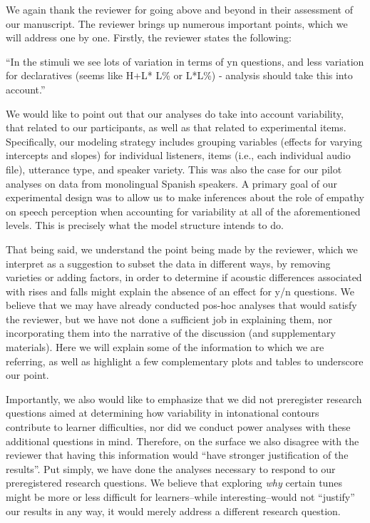 \documentclass[]{article}
\begin{document}
We again thank the reviewer for going above and beyond in their assessment of our manuscript.
The reviewer brings up numerous important points, which we will address one by one.
Firstly, the reviewer states the following:

``In the stimuli we see lots of variation in terms of yn questions, and less variation for declaratives (seems like H+L* L\% or L*L\%) - analysis should take this into account.''

We would like to point out that our analyses do take into account variability, that related to our participants, as well as that related to experimental items.
Specifically, our modeling strategy includes grouping variables (effects for varying intercepts and slopes) for individual listeners, items (i.e., each individual audio file), utterance type, and speaker variety.
This was also the case for our pilot analyses on data from monolingual Spanish speakers.
A primary goal of our experimental design was to allow us to make inferences about the role of empathy on speech perception when accounting for variability at all of the aforementioned levels.
This is precisely what the model structure intends to do.

That being said, we understand the point being made by the reviewer, which we interpret as a suggestion to subset the data in different ways, by removing varieties or adding factors, in order to determine if acoustic differences associated with rises and falls might explain the absence of an effect for y/n questions.
We believe that we may have already conducted pos-hoc analyses that would satisfy the reviewer, but we have not done a sufficient job in explaining them, nor incorporating them into the narrative of the discussion (and supplementary materials).
Here we will explain some of the information to which we are referring, as well as highlight a few complementary plots and tables to underscore our point.

Importantly, we also would like to emphasize that we did not preregister research questions aimed at determining how variability in intonational contours contribute to learner difficulties, nor did we conduct power analyses with these additional questions in mind.
Therefore, on the surface we also disagree with the reviewer that having this information would ``have stronger justification of the results''.
Put simply, we have done the analyses necessary to respond to our preregistered research questions.
We believe that exploring \emph{why} certain tunes might be more or less difficult for learners--while interesting--would not ``justify'' our results in any way, it would merely address a different research question.
\end{document}
